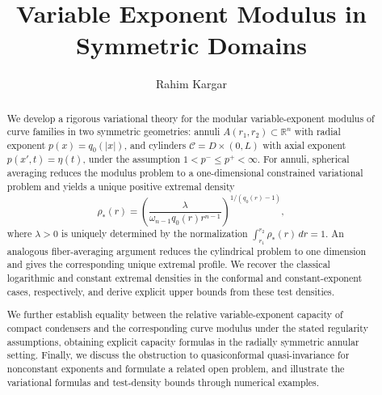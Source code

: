 \documentclass[12pt]{amsart}
\numberwithin{equation}{section}
\theoremstyle{plain}
\theoremstyle{definition}
\begin{document}



\title[Variable Exponent Modulus in Symmetric Domains]%
      {Variable Exponent Modulus in Symmetric Domains}

\author{Rahim Kargar}
\address{Department of Mathematics and Statistics,
         University of Turku, Turku, Finland}


\begin{abstract}
We develop a rigorous variational theory for the modular variable-exponent
modulus of curve families in two symmetric geometries: annuli
$A(r_1,r_2)\subset\mathbb{R}^n$ with radial exponent
$p(x)=q_0(|x|)$, and cylinders $\mathcal C=D\times(0,L)$ with axial exponent
$p(x',t)=\eta(t)$, under the assumption
$1<p^-\le p^+<\infty$. For annuli, spherical averaging reduces the modulus
problem to a one-dimensional constrained variational problem and yields a
unique positive extremal density
\begin{equation*}
\rho_*(r)
=
\left(
\frac{\lambda}
{\omega_{n-1}q_0(r)r^{n-1}}
\right)^{1/(q_0(r)-1)},
\end{equation*}
where $\lambda>0$ is uniquely determined by the normalization
$\int_{r_1}^{r_2}\rho_*(r)\,dr=1$. An analogous fiber-averaging argument
reduces the cylindrical problem to one dimension and gives the corresponding
unique extremal profile. We recover the classical logarithmic and constant
extremal densities in the conformal and constant-exponent cases, respectively,
and derive explicit upper bounds from these test densities.

We further establish equality between the relative variable-exponent
capacity of compact condensers and the corresponding curve modulus under the
stated regularity assumptions, obtaining explicit capacity formulas in the
radially symmetric annular setting. Finally, we discuss the obstruction to
quasiconformal quasi-invariance for nonconstant exponents and formulate a
related open problem, and illustrate the variational formulas and test-density
bounds through numerical examples.
\end{abstract}


\maketitle
\end{document}

